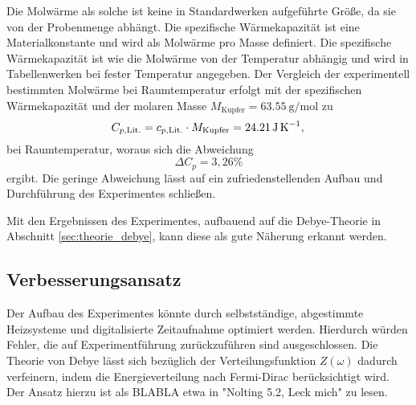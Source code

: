 Die Molwärme als solche ist keine in Standardwerken aufgeführte Größe, da sie von der Probenmenge abhängt.
Die spezifische Wärmekapazität ist eine Materialkonstante und wird als Molwärme pro Masse definiert.
Die spezifische Wärmekapazität ist wie die Molwärme von der Temperatur abhängig und wird in Tabellenwerken bei fester Temperatur angegeben.
Der Vergleich der experimentell bestimmten Molwärme bei Raumtemperatur erfolgt mit der spezifischen Wärmekapazität und der molaren Masse $M_{\text{Kupfer}}=\SI{63.55}{\gram\per\mol}$ zu
\begin{equation}
	C_{p,\text{Lit.}} = c_{p,\text{Lit.}}\cdot M_{\text{Kupfer}}= \SI{24.21}{\joule\per\kelvin},\\
\end{equation}
bei Raumtemperatur, woraus sich die Abweichung
\begin{equation}
	\Delta C_p = 3{,}26 \%
\end{equation}
ergibt.
Die geringe Abweichung lässt auf ein zufriedenstellenden Aufbau und Durchführung des Experimentes schließen.

Mit den Ergebnissen des Experimentes, aufbauend auf die Debye-Theorie in Abschnitt \ref{sec:theorie_debye}, 
kann diese als gute Näherung erkannt werden.

\subsection{Verbesserungsansatz}
Der Aufbau des Experimentes könnte durch selbstständige, abgestimmte Heizsysteme und digitalisierte Zeitaufnahme optimiert werden.
Hierdurch würden Fehler, die auf Experimentführung zurückzuführen sind ausgeschlossen.
Die Theorie von Debye lässt sich bezüglich der Verteilungsfunktion $Z(\omega)$ dadurch verfeinern, 
indem die Energieverteilung nach Fermi-Dirac berücksichtigt wird. 
Der Ansatz hierzu ist als BLABLA etwa in "Nolting 5.2, Leck mich" zu lesen.